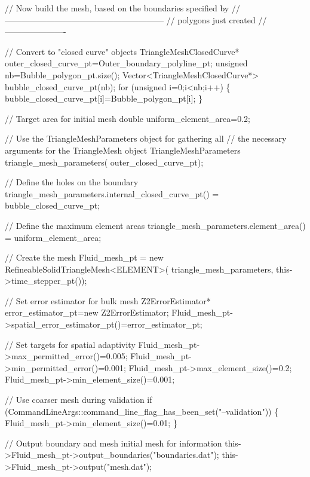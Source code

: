 \begin{DoxyCodeInclude}
 \textcolor{comment}{// Now build the mesh, based on the boundaries specified by}
 \textcolor{comment}{//---------------------------------------------------------}
 \textcolor{comment}{// polygons just created}
 \textcolor{comment}{//----------------------}

 \textcolor{comment}{// Convert to "closed curve" objects}
 TriangleMeshClosedCurve* outer\_closed\_curve\_pt=Outer\_boundary\_polyline\_pt;
 \textcolor{keywordtype}{unsigned} nb=Bubble\_polygon\_pt.size();
 Vector<TriangleMeshClosedCurve*> bubble\_closed\_curve\_pt(nb);
 \textcolor{keywordflow}{for} (\textcolor{keywordtype}{unsigned} i=0;i<nb;i++)
  \{
   bubble\_closed\_curve\_pt[i]=Bubble\_polygon\_pt[i];
  \}

 \textcolor{comment}{// Target area for initial mesh}
 \textcolor{keywordtype}{double} uniform\_element\_area=0.2;

 \textcolor{comment}{// Use the TriangleMeshParameters object for gathering all}
 \textcolor{comment}{// the necessary arguments for the TriangleMesh object}
 TriangleMeshParameters triangle\_mesh\_parameters(
   outer\_closed\_curve\_pt);

 \textcolor{comment}{// Define the holes on the boundary}
 triangle\_mesh\_parameters.internal\_closed\_curve\_pt() =
   bubble\_closed\_curve\_pt;

 \textcolor{comment}{// Define the maximum element areas}
 triangle\_mesh\_parameters.element\_area() =
   uniform\_element\_area;

 \textcolor{comment}{// Create the mesh}
 Fluid\_mesh\_pt =
   \textcolor{keyword}{new} RefineableSolidTriangleMesh<ELEMENT>(
     triangle\_mesh\_parameters, this->time\_stepper\_pt());

 \textcolor{comment}{// Set error estimator for bulk mesh}
 Z2ErrorEstimator* error\_estimator\_pt=\textcolor{keyword}{new} Z2ErrorEstimator;
 Fluid\_mesh\_pt->spatial\_error\_estimator\_pt()=error\_estimator\_pt;

 \textcolor{comment}{// Set targets for spatial adaptivity}
 Fluid\_mesh\_pt->max\_permitted\_error()=0.005;
 Fluid\_mesh\_pt->min\_permitted\_error()=0.001;
 Fluid\_mesh\_pt->max\_element\_size()=0.2;
 Fluid\_mesh\_pt->min\_element\_size()=0.001; 

 \textcolor{comment}{// Use coarser mesh during validation}
 \textcolor{keywordflow}{if} (CommandLineArgs::command\_line\_flag\_has\_been\_set(\textcolor{stringliteral}{"--validation"}))
  \{
   Fluid\_mesh\_pt->min\_element\_size()=0.01; 
  \}

 \textcolor{comment}{// Output boundary and mesh initial mesh for information}
 this->Fluid\_mesh\_pt->output\_boundaries(\textcolor{stringliteral}{"boundaries.dat"});
 this->Fluid\_mesh\_pt->output(\textcolor{stringliteral}{"mesh.dat"});

\end{DoxyCodeInclude}


